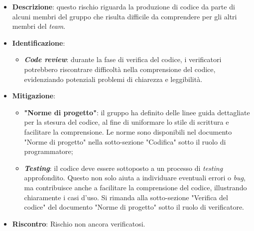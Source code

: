 \label{risk:codice incomprensibile}
\begin{itemize}
	\item \textbf{Descrizione}: questo rischio riguarda la produzione di codice
	      da parte di alcuni membri del gruppo che risulta
	      difficile da comprendere per gli altri membri del \textit{team}.
	\item \textbf{Identificazione}:
	      \begin{itemize}
		      \item \textbf{\textit{Code review}}: durante la fase di verifica del codice,
		            i verificatori potrebbero riscontrare difficoltà
		            nella comprensione del codice, evidenziando
		            potenziali problemi di chiarezza e leggibilità.
	      \end{itemize}

	\item \textbf{Mitigazione}:
	      \begin{itemize}
		      \item \textbf{"Norme di progetto"}: il gruppo ha definito delle linee guida dettagliate
		            per la stesura del codice, al fine di uniformare lo stile di scrittura e facilitare
		            la comprensione. Le norme sono disponibili nel documento "Norme di progetto"
		            nella sotto-sezione "Codifica" sotto il ruolo di programmatore;

		      \item \textbf{\textit{Testing}}: il codice deve essere sottoposto a un processo di
		            \textit{testing} approfondito. Questo non solo aiuta a individuare eventuali errori o \textit{bug},
		            ma contribuisce anche a facilitare la comprensione del codice, illustrando
		            chiaramente i casi d'uso. Si rimanda alla sotto-sezione "Verifica del codice"
		            del documento "Norme di progetto" sotto il ruolo di verificatore.
	      \end{itemize}
	\item \textbf{Riscontro}: Rischio non ancora verificatosi.
\end{itemize}
